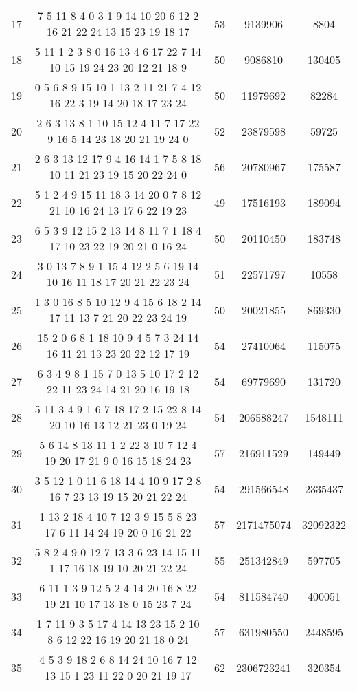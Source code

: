 \documentclass[a4paper,11pt,oneside,openany]{jsbook}
\begin{document}
\begin{table}[]
\begin{tabular}{|c|c|c|c|c|}
17 & 7 5 11 8 4 0 3 1 9 14 10 20 6 12 2 16 21 22 24 13 15 23 19 18 17  & 53 & 9139906 & 8804 \\
18 & 5 11 1 2 3 8 0 16 13 4 6 17 22 7 14 10 15 19 24 23 20 12 21 18 9  & 50 & 9086810 & 130405 \\
19 & 0 5 6 8 9 15 10 1 13 2 11 21 7 4 12 16 22 3 19 14 20 18 17 23 24  & 50 & 11979692 & 82284 \\
20 & 2 6 3 13 8 1 10 15 12 4 11 7 17 22 9 16 5 14 23 18 20 21 19 24 0  & 52 & 23879598 & 59725 \\
21 & 2 6 3 13 12 17 9 4 16 14 1 7 5 8 18 10 11 21 23 19 15 20 22 24 0  & 56 & 20780967 & 175587 \\
22 & 5 1 2 4 9 15 11 18 3 14 20 0 7 8 12 21 10 16 24 13 17 6 22 19 23  & 49 & 17516193 & 189094 \\
23 & 6 5 3 9 12 15 2 13 14 8 11 7 1 18 4 17 10 23 22 19 20 21 0 16 24  & 50 & 20110450 & 183748 \\
24 & 3 0 13 7 8 9 1 15 4 12 2 5 6 19 14 10 16 11 18 17 20 21 22 23 24  & 51 & 22571797 & 10558 \\
25 & 1 3 0 16 8 5 10 12 9 4 15 6 18 2 14 17 11 13 7 21 20 22 23 24 19  & 50 & 20021855 & 869330 \\
26 & 15 2 0 6 8 1 18 10 9 4 5 7 3 24 14 16 11 21 13 23 20 22 12 17 19  & 54 & 27410064 & 115075 \\
27 & 6 3 4 9 8 1 15 7 0 13 5 10 17 2 12 22 11 23 24 14 21 20 16 19 18  & 54 & 69779690 & 131720 \\
28 & 5 11 3 4 9 1 6 7 18 17 2 15 22 8 14 20 10 16 13 12 21 23 0 19 24  & 54 & 206588247 & 1548111 \\
29 & 5 6 14 8 13 11 1 2 22 3 10 7 12 4 19 20 17 21 9 0 16 15 18 24 23  & 57 & 216911529 & 149449 \\
30 & 3 5 12 1 0 11 6 18 14 4 10 9 17 2 8 16 7 23 13 19 15 20 21 22 24  & 54 & 291566548 & 2335437 \\
31 & 1 13 2 18 4 10 7 12 3 9 15 5 8 23 17 6 11 14 24 19 20 0 16 21 22  & 57 & 2171475074 & 32092322 \\
32 & 5 8 2 4 9 0 12 7 13 3 6 23 14 15 11 1 17 16 18 19 10 20 21 22 24  & 55 & 251342849 & 597705 \\
33 & 6 11 1 3 9 12 5 2 4 14 20 16 8 22 19 21 10 17 13 18 0 15 23 7 24  & 54 & 811584740 & 400051 \\
34 & 1 7 11 9 3 5 17 4 14 13 23 15 2 10 8 6 12 22 16 19 20 21 18 0 24  & 57 & 631980550 & 2448595 \\
35 & 4 5 3 9 18 2 6 8 14 24 10 16 7 12 13 15 1 23 11 22 0 20 21 19 17  & 62 & 2306723241 & 320354 \\

\end{tabular}
\end{table}
\end{document}
